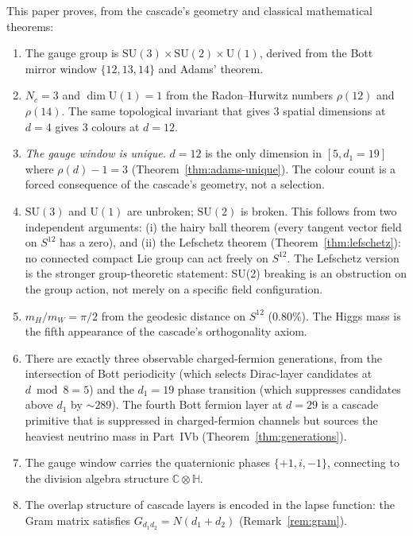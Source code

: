 \documentclass[12pt,a4paper]{article}
\begin{document}
This paper proves, from the cascade's geometry and classical mathematical theorems:

\begin{enumerate}
\item The gauge group is $\mathrm{SU}(3)\times\mathrm{SU}(2)\times\mathrm{U}(1)$, derived
from the Bott mirror window $\{12,13,14\}$ and Adams' theorem.

\item $N_c=3$ and $\dim\mathrm{U}(1)=1$ from the Radon--Hurwitz numbers $\rho(12)$ and
$\rho(14)$. The same topological invariant that gives 3 spatial dimensions at $d=4$ gives
3 colours at $d=12$.

\item \emph{The gauge window is unique.} $d=12$ is the only dimension in $[5,d_1=19]$ where
$\rho(d)-1=3$ (Theorem~\ref{thm:adams-unique}). The colour count is a forced consequence
of the cascade's geometry, not a selection.

\item $\mathrm{SU}(3)$ and $\mathrm{U}(1)$ are unbroken; $\mathrm{SU}(2)$ is broken.
This follows from two independent arguments: (i) the hairy ball theorem (every tangent
vector field on $S^{12}$ has a zero), and (ii) the Lefschetz theorem
(Theorem~\ref{thm:lefschetz}): no connected compact Lie group can act freely on $S^{12}$.
The Lefschetz version is the stronger group-theoretic statement: SU(2) breaking is an
obstruction on the group action, not merely on a specific field configuration.

\item $m_H/m_W=\pi/2$ from the geodesic distance on $S^{12}$ (0.80\%). The Higgs mass is
the fifth appearance of the cascade's orthogonality axiom.

\item There are exactly three observable charged-fermion generations, from the intersection
of Bott periodicity (which selects Dirac-layer candidates at $d\bmod 8=5$) and the
$d_1=19$ phase transition (which suppresses candidates above $d_1$ by $\sim 289$). The
fourth Bott fermion layer at $d=29$ is a cascade primitive that is suppressed in
charged-fermion channels but sources the heaviest neutrino mass in Part~IVb
(Theorem~\ref{thm:generations}).

\item The gauge window carries the quaternionic phases $\{+1,i,-1\}$, connecting to the
division algebra structure $\mathbb{C}\otimes\mathbb{H}$.

\item The overlap structure of cascade layers is encoded in the lapse function: the Gram
matrix satisfies $G_{d_1 d_2}=N(d_1+d_2)$ (Remark~\ref{rem:gram}).


\end{enumerate}
\end{document}
